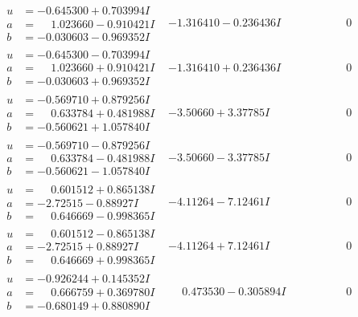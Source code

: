 \documentclass[1p]{elsarticle_modified}
\theoremstyle{definition}
\begin{document}
$$\begin{array}{c|c|c}
\begin{aligned}
u &= -0.645300 + 0.703994 I \\
a &= \phantom{-}1.023660 - 0.910421 I \\
b &= -0.030603 - 0.969352 I\end{aligned}
 & -1.316410 - 0.236436 I & \phantom{-0.000000 } 0 \\ \hline\begin{aligned}
u &= -0.645300 - 0.703994 I \\
a &= \phantom{-}1.023660 + 0.910421 I \\
b &= -0.030603 + 0.969352 I\end{aligned}
 & -1.316410 + 0.236436 I & \phantom{-0.000000 } 0 \\ \hline\begin{aligned}
u &= -0.569710 + 0.879256 I \\
a &= \phantom{-}0.633784 + 0.481988 I \\
b &= -0.560621 + 1.057840 I\end{aligned}
 & -3.50660 + 3.37785 I & \phantom{-0.000000 } 0 \\ \hline\begin{aligned}
u &= -0.569710 - 0.879256 I \\
a &= \phantom{-}0.633784 - 0.481988 I \\
b &= -0.560621 - 1.057840 I\end{aligned}
 & -3.50660 - 3.37785 I & \phantom{-0.000000 } 0 \\ \hline\begin{aligned}
u &= \phantom{-}0.601512 + 0.865138 I \\
a &= -2.72515 - 0.88927 I \\
b &= \phantom{-}0.646669 - 0.998365 I\end{aligned}
 & -4.11264 - 7.12461 I & \phantom{-0.000000 } 0 \\ \hline\begin{aligned}
u &= \phantom{-}0.601512 - 0.865138 I \\
a &= -2.72515 + 0.88927 I \\
b &= \phantom{-}0.646669 + 0.998365 I\end{aligned}
 & -4.11264 + 7.12461 I & \phantom{-0.000000 } 0 \\ \hline\begin{aligned}
u &= -0.926244 + 0.145352 I \\
a &= \phantom{-}0.666759 + 0.369780 I \\
b &= -0.680149 + 0.880890 I\end{aligned}
 & \phantom{-}0.473530 - 0.305894 I & \phantom{-0.000000 } 0 \\ \hline\begin{aligned}

\end{aligned}
\end{array}$$
\end{document}
